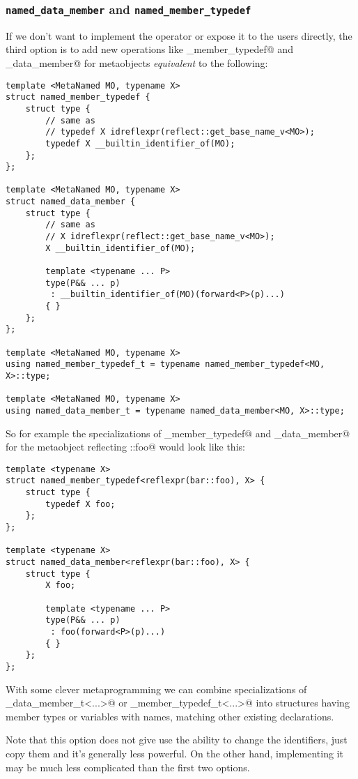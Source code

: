 \subsubsection{\texttt{named\_data\_member} and \texttt{named\_member\_typedef}}
\label{fut-named-member-X}

If we don't want to implement the operator \verb@idreflexpr@ or expose it
to the users directly, the third option is to add new operations like
\verb@named_member_typedef@  and \verb@named_data_member@ for 
metaobjects {\em equivalent} to the following:

\begin{verbatim}
template <MetaNamed MO, typename X>
struct named_member_typedef {
	struct type {
		// same as
		// typedef X idreflexpr(reflect::get_base_name_v<MO>);
		typedef X __builtin_identifier_of(MO);
	};
};

template <MetaNamed MO, typename X>
struct named_data_member {
	struct type {
		// same as
		// X idreflexpr(reflect::get_base_name_v<MO>);
		X __builtin_identifier_of(MO);

		template <typename ... P>
		type(P&& ... p)
		 : __builtin_identifier_of(MO)(forward<P>(p)...) 
		{ }
	};
};

template <MetaNamed MO, typename X>
using named_member_typedef_t = typename named_member_typedef<MO, X>::type;

template <MetaNamed MO, typename X>
using named_data_member_t = typename named_data_member<MO, X>::type;
\end{verbatim}

So for example the specializations of \verb@named_member_typedef@ and
\verb@named_data_member@ for the metaobject reflecting \verb@bar::foo@ would
look like this:

\begin{verbatim}
template <typename X>
struct named_member_typedef<reflexpr(bar::foo), X> {
	struct type {
		typedef X foo;
	};
};

template <typename X>
struct named_data_member<reflexpr(bar::foo), X> {
	struct type {
		X foo;

		template <typename ... P>
		type(P&& ... p)
		 : foo(forward<P>(p)...) 
		{ }
	};
};
\end{verbatim}

With some clever metaprogramming we can combine specializations
of \verb@named_data_member_t<...>@ or \verb@named_member_typedef_t<...>@
into structures having member types or variables with names, matching other
existing declarations.

Note that this option does not give use the ability to change the identifiers,
just copy them and it's generally less powerful.
On the other hand, implementing it may be much less complicated
than the first two options.

